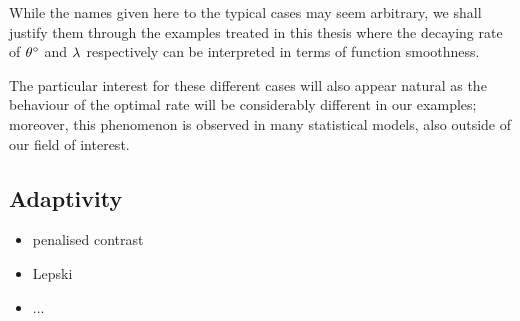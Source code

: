 While the names given here to the typical cases may seem arbitrary, we shall justify them through the examples treated in this thesis where the decaying rate of ${\theta^{\circ}_{}}$ and ${\lambda_{}}$ respectively can be interpreted in terms of function smoothness.

The particular interest for these different cases will also appear natural as the behaviour of the optimal rate will be considerably different in our examples; moreover, this phenomenon is observed in many statistical models, also outside of our field of interest.

\subsection{Adaptivity}\label{INTRO_FREQ_ADAPTIVITY}
\begin{itemize}
\item penalised contrast
\item Lepski
\item ...
\end{itemize}
